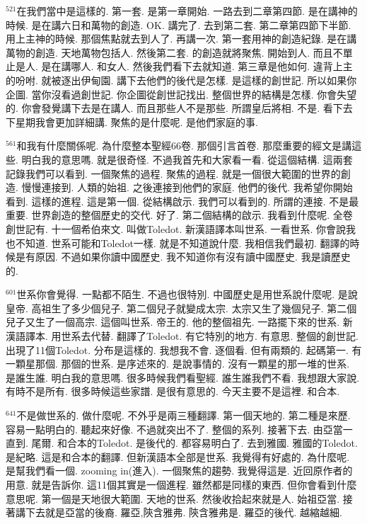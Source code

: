 \documentclass{book}
\begin{document}
$^{521}$在我們當中是這樣的.
第一套.
是第一章開始.
一路去到二章第四節.
是在講神的時候.
是在講六日和萬物的創造.
OK.
講完了.
去到第二套.
第二章第四節下半節.
用上主神的時候.
那個焦點就去到人了.
再講一次.
第一套用神的創造紀錄.
是在講萬物的創造.
天地萬物包括人.
然後第二套.
的創造就將聚焦.
開始到人.
而且不單止是人.
是在講哪人.
和女人.
然後我們看下去就知道.
第三章是他如何.
違背上主的吩咐.
就被逐出伊甸園.
講下去他們的後代是怎樣.
是這樣的創世記.
所以如果你企圖.
當你沒看過創世記.
你企圖從創世記找出.
整個世界的結構是怎樣.
你會失望的.
你會發覺講下去是在講人.
而且那些人不是那些.
所謂皇后將相.
不是.
看下去下星期我會更加詳細講.
聚焦的是什麼呢.
是他們家庭的事.

$^{561}$和我有什麼關係呢.
為什麼整本聖經66卷.
那個引言首卷.
那麼重要的經文是講這些.
明白我的意思嗎.
就是很奇怪.
不過我首先和大家看一看.
從這個結構.
這兩套記錄我們可以看到.
一個聚焦的過程.
聚焦的過程.
就是一個很大範圍的世界的創造.
慢慢連接到.
人類的始祖.
之後連接到他們的家庭.
他們的後代.
我希望你開始看到.
這樣的進程.
這是第一個.
從結構啟示.
我們可以看到的.
所謂的連接.
不是最重要.
世界創造的整個歷史的交代.
好了.
第二個結構的啟示.
我看到什麼呢.
全卷創世記有.
十一個希伯來文.
叫做Toledot.
新漢語譯本叫世系.
一看世系.
你會說我也不知道.
世系可能和Toledot一樣.
就是不知道說什麼.
我相信我們最初.
翻譯的時候是有原因.
不過如果你讀中國歷史.
我不知道你有沒有讀中國歷史.
我是讀歷史的.

$^{601}$世系你會覺得.
一點都不陌生.
不過也很特別.
中國歷史是用世系說什麼呢.
是說皇帝.
高祖生了多少個兒子.
第二個兒子就變成太宗.
太宗又生了幾個兒子.
第二個兒子又生了一個高宗.
這個叫世系.
帝王的.
他的整個祖先.
一路擺下來的世系.
新漢語譯本.
用世系去代替.
翻譯了Toledot.
有它特別的地方.
有意思.
整個的創世記.
出現了11個Toledot.
分布是這樣的.
我想我不會.
逐個看.
但有兩類的.
起碼第一.
有一顆星那個.
那個的世系.
是序述來的.
是說事情的.
沒有一顆星的那一堆的世系.
是誰生誰.
明白我的意思嗎.
很多時候我們看聖經.
誰生誰我們不看.
我想跟大家說.
有時不是所有.
很多時候這些家譜.
是很有意思的.
今天主要不是這裡.
和合本.

$^{641}$不是做世系的.
做什麼呢.
不外乎是兩三種翻譯.
第一個天地的.
第二種是來歷.
容易一點明白的.
聽起來好像.
不過就突出不了.
整個的系列.
接著下去.
由亞當一直到.
尾爾.
和合本的Toledot.
是後代的.
都容易明白了.
去到雅國.
雅國的Toledot.
是紀略.
這是和合本的翻譯.
但新漢語本全部是世系.
我覺得有好處的.
為什麼呢.
是幫我們看一個.
zooming in(進入).
一個聚焦的趨勢.
我覺得這是.
近回原作者的用意.
就是告訴你.
這11個其實是一個進程.
雖然都是同樣的東西.
但你會看到什麼意思呢.
第一個是天地很大範圍.
天地的世系.
然後收拾起來就是人.
始祖亞當.
接著講下去就是亞當的後裔.
羅亞,陝含雅弗.
陝含雅弗是.
羅亞的後代.
越縮越細.
\end{document}
